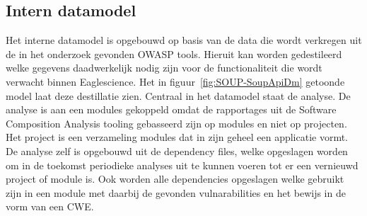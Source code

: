 \subsection{Intern datamodel}\label{subsec:interne-datamodel}
Het interne datamodel is opgebouwd op basis van de data die wordt verkregen uit de in het onderzoek gevonden OWASP tools. Hieruit kan worden gedestileerd welke gegevens daadwerkelijk nodig zijn voor de functionaliteit die wordt verwacht binnen Eaglescience. Het in figuur~\ref{fig:SOUP-SoupApiDm} getoonde model laat deze destillatie zien. Centraal in het datamodel staat de analyse. De analyse is aan een modules gekoppeld omdat de rapportages uit de Software Composition Analysis tooling gebasseerd zijn op modules en niet op projecten. Het project is een verzameling modules dat in zijn geheel een applicatie vormt. De analyse zelf is opgebouwd uit de dependency files, welke opgeslagen worden om in de toekomst periodieke analyses uit te kunnen voeren tot er een vernieuwd project of module is. Ook worden alle dependencies opgeslagen welke gebruikt zijn in een module met daarbij de gevonden vulnarabilities en het bewijs in de vorm van een CWE.

